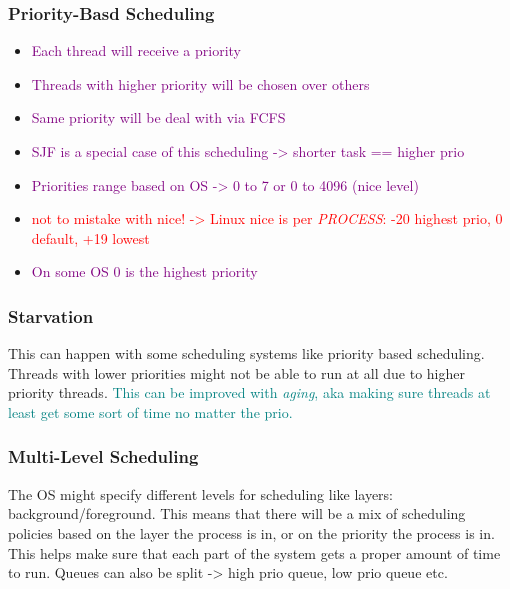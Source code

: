 \documentclass[main.tex,fontsize=8pt,paper=a4,paper=portrait,DIV=calc,]{scrartcl}
\begin{document}
\subsubsection{Priority-Basd Scheduling}
\begin{itemize}
\item \textcolor{purple}{Each thread will receive a priority}
\item \textcolor{purple}{Threads with higher priority will be chosen over others}
\item \textcolor{purple}{Same priority will be deal with via FCFS}
\item \textcolor{purple}{SJF is a special case of this scheduling -> shorter task == higher prio}
\item \textcolor{purple}{Priorities range based on OS -> 0 to 7 or 0 to 4096 (nice level)}
\item \textcolor{red}{not to mistake with nice! -> Linux nice is per \emph{PROCESS}: -20 highest prio, 0 default, +19 lowest}
\item \textcolor{purple}{On some OS 0 is the highest priority}
\end{itemize} 

\subsubsection{Starvation}
This can happen with some scheduling systems like priority based scheduling.
Threads with lower priorities might not be able to run at all due to higher priority threads.
\textcolor{teal}{This can be improved with \emph{aging}, aka making sure threads at least get some sort of time no matter the prio.}

\subsubsection{Multi-Level Scheduling}
The OS might specify different levels for scheduling like layers: background/foreground.\newline
This means that there will be a mix of scheduling policies based on the layer the process is in, or on the priority the process is in.\newline
This helps make sure that each part of the system gets a proper amount of time to run.\newline
Queues can also be split -> high prio queue, low prio queue etc.
\end{document}
